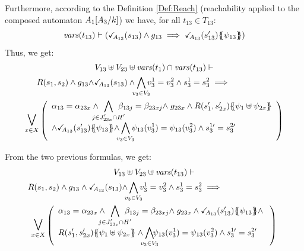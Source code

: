 \documentclass[runningheads]{llncs}
\begin{document}
\begin{enumerate}
 Furthermore,  according to the Definition \ref{Def:Reach} (reachability applied to the composed automaton ${A_1{\left[A_3\middle/k\right]}}$) we have, for all $t_{13} \in T_{13}$:
\[ \fvars{t_{13}} \vdash \left(\reach{A_{13}}\mpar{s_{13}} \wedge g_{13} \implies \reach{A_{13}}\mpar{s_{13}'}\psubst{\psi_{13}}\right) \]	
Thus, we get:
\begin{multline*}
V_{13} \uplus V_{23} \uplus \fvars{t_1}  \cap \fvars{t_{13}} \vdash\\
R\mpar{s_1, s_{2}} \wedge g_{13}  {\wedge \reach{A_{13}}\mpar{s_{13}}}
\wedge \bigwedge_\subbox{v_3\in V_3}  v^1_3=v^2_3\wedge s^1_3=s^2_3
\implies \hspace{5em} \\ \operatorname*{\bigsymb{\bigvee}}_{x \in X} \mpar{\everymath{\displaystyle}
\begin{array}{l}
			\alpha_{13} = \alpha_{23x} \wedge \bigwedge_\subbox{j \in J'_{23x} \cap H'} \beta_{13j} = \beta_{23xj} \nwedge 	g_{23x} \wedge R\mpar{s'_1, s'_{2x}}\psubst{\psi_1 \uplus \psi_{2x}}\\
		  \wedge {\reach{A_{13}}\mpar{s_{13}'}\psubst{\psi_{13}} 
\wedge} \bigwedge_\subbox{v_3\in V_3}  \psi_{13}(v^1_3)=\psi_{13}(v^2_3)\wedge s^{1\prime}_3=s^{2\prime}_3
		\end{array}}   
\end{multline*}
	
From the two previous formulas, we get:
\begin{multline*}
V_{13} \uplus V_{23} \uplus \fvars{t_{13}}  \vdash\\
R\mpar{s_1, s_{2}} \wedge g_{13} \land {\reach{A_{13}}\mpar{s_{13}} \land} \bigwedge_\subbox{v_3\in V_3} v^1_3=v^2_3 \wedge s^1_3 = s^2_3
\implies \hspace{7em} \\ \operatorname*{\bigsymb{\bigvee}}_{x \in X} \mpar{\everymath{\displaystyle}
\begin{array}{l}
			\alpha_{13} = \alpha_{23x} \wedge \bigwedge_\subbox{j \in J'_{23x} \cap H'} \beta_{13j} = \beta_{23xj} \nwedge g_{23x}\land  {\reach{A_{13}}\mpar{s_{13}'}\psubst{\psi_{13}}}		\nwedge\\
			  R\mpar{s'_1, s'_{2x}}\psubst{\psi_1 \uplus \psi_{2x}} \wedge
 \bigwedge_\subbox{v_3\in V_3}\!\! \psi_{13}(v^1_3)=\psi_{13}(v^2_3) \wedge s^{1\prime}_3 = s^{2\prime}_3
		\end{array}}   
\end{multline*}


\end{enumerate}
\end{document}
